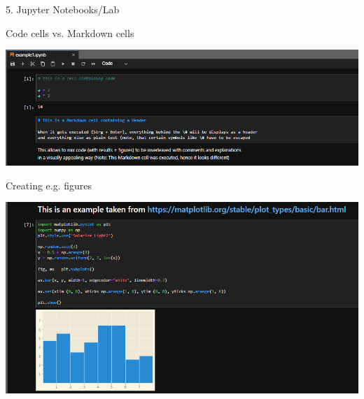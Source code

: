 
\begin{vbframe}{5. Jupyter Notebooks/Lab}

\vfill

Code cells vs. Markdown cells

\vspace{.2cm}


\includegraphics[width=.6\textwidth]{figure/jupyter1.png}

Creating e.g. figures

\vspace{.2cm}

\includegraphics[width=.6\textwidth]{figure/jupyter2.png}

\vfill

\end{vbframe}


